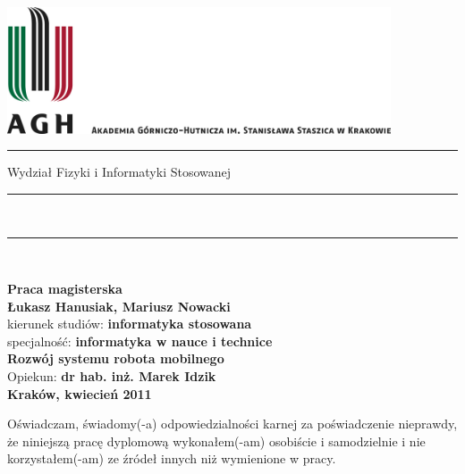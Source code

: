 \documentclass[a4paper,12pt, oneside]{mwbk}
\begin{document}
\thispagestyle{empty}
\includegraphics[height=37.5mm]{../images/agh_nzw_a_pl_1w_wbr_rgb_150ppi.jpg}\\
\rule{30mm}{0pt}
{\large \textsf{Wydział Fizyki i Informatyki Stosowanej}}\\
\rule{\textwidth}{3pt}\\
\rule[2ex]
{\textwidth}{1pt}\\
\vspace{7ex}
\begin{center}
{\LARGE \bf \textsf{Praca magisterska}}\\
\vspace{13ex}
{\bf \Large \textsf{Łukasz Hanusiak, Mariusz Nowacki}}\\
\vspace{3ex}
{\sf\small kierunek studiów:} {\bf\small \textsf{informatyka stosowana}}\\
\vspace{1.5ex}
{\sf\small specjalność:} {\bf\small \textsf{informatyka w nauce i technice}}\\
\vspace{10ex}
{\bf \huge \textsf{Rozwój systemu robota mobilnego}}\\
\vspace{14ex}
{\Large Opiekun: \bf \textsf{dr hab. inż. Marek Idzik}}\\
\vspace{22ex}
{\large \bf \textsf{Kraków, kwiecień 2011}}
\end{center}

\newpage

{\sf Oświadczam, świadomy(-a) odpowiedzialności karnej za poświadczenie nieprawdy, że niniejszą pracę dyplomową wykonałem(-am) osobiście i samodzielnie i  nie korzystałem(-am) ze źródeł innych niż wymienione w pracy.}
\end{document}

